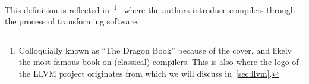 This definition is reflected in~\footnote{Colloquially known as ``The Dragon Book'' because of the cover, and likely the most famous book on (classical) compilers. This is also where the logo of the LLVM project originates from which we will discuss in~\cref{sec:llvm}.}~\cite{dragonbook} where the authors introduce compilers through the process of transforming software.
